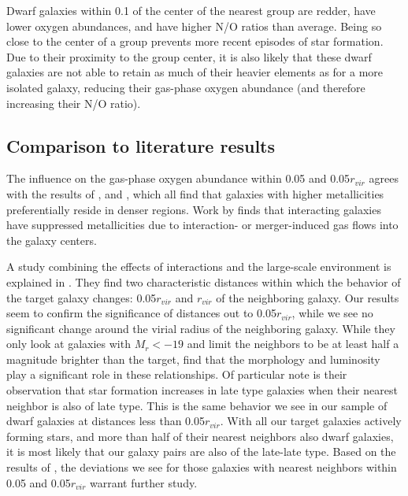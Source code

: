 Dwarf galaxies within 0.1 \hMpc of the center of the nearest group are redder, 
have lower oxygen abundances, and have higher N/O ratios than average.  Being so 
close to the center of a group prevents more recent episodes of star formation.  
Due to their proximity to the group center, it is also likely that these dwarf 
galaxies are not able to retain as much of their heavier elements as for a more 
isolated galaxy, reducing their gas-phase oxygen abundance (and therefore 
increasing their N/O ratio).


\subsection{Comparison to literature results}

The influence on the gas-phase oxygen abundance within 0.05 \hMpc and 
0.05$r_{vir}$ agrees with the results of \cite{Shields91,Pustilnik06,Cooper08,
Ellison09,Pustilnik11a,Pustilnik14}, and \cite{SanchezAlmeida16}, which all find 
that galaxies with higher metallicities preferentially reside in denser regions.  
Work by \cite{Rupke08} finds that interacting galaxies have suppressed 
metallicities due to interaction- or merger-induced gas flows into the galaxy 
centers.

A study combining the effects of interactions and the large-scale environment is 
explained in \cite{Park09}.  They find two characteristic distances within which 
the behavior of the target galaxy changes: 0.05$r_{vir}$ and $r_{vir}$ of the 
neighboring galaxy.  Our results seem to confirm the significance of distances 
out to 0.05$r_{vir}$, while we see no significant change around the virial 
radius of the neighboring galaxy.  While they only look at galaxies with 
$M_r < -19$ and limit the neighbors to be at least half a magnitude brighter 
than the target, \cite{Park09} find that the morphology and luminosity play a 
significant role in these relationships.  Of particular note is their 
observation that star formation increases in late type galaxies when their 
nearest neighbor is also of late type.  This is the same behavior we see in our 
sample of dwarf galaxies at distances less than 0.05$r_{vir}$.  With all our 
target galaxies actively forming stars, and more than half of their nearest 
neighbors also dwarf galaxies, it is most likely that our galaxy pairs are also 
of the late-late type.  Based on the results of \cite{Park09}, the deviations we 
see for those galaxies with nearest neighbors within 0.05 \hMpc and 
0.05$r_{vir}$ warrant further study.



